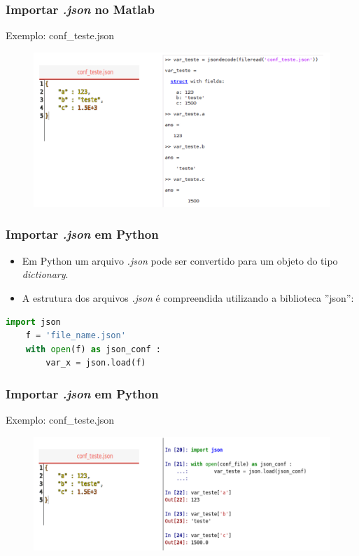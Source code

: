 \documentclass[11pt]{beamer}
\begin{document}
\begin{frame}
\frametitle{Importar \textit{.json} no  Matlab\textregistered} 
Exemplo: conf\_teste.json
	\begin{figure}
			\includegraphics[scale=0.3]{ler_json_matlab}
	\end{figure}
\end{frame}

\begin{frame}[fragile]
	\frametitle{Importar \textit{.json} em  Python}
	\begin{itemize}
		\item Em Python um arquivo \textit{.json} pode ser convertido para um objeto do tipo \textit{dictionary}.
		\item A estrutura dos arquivos \textit{.json} é compreendida utilizando a biblioteca ''json'':
	\end{itemize}
\begin{lstlisting}[language=python]
	import json
	f = 'file_name.json'
	with open(f) as json_conf : 
		var_x = json.load(f)
\end{lstlisting}

\end{frame}

\begin{frame}
	\frametitle{Importar \textit{.json} em Python} 
	Exemplo: conf\_teste.json
	\begin{figure}
		\includegraphics[scale=0.3]{ler_json_python}
	\end{figure}
\end{frame}
\end{document}
